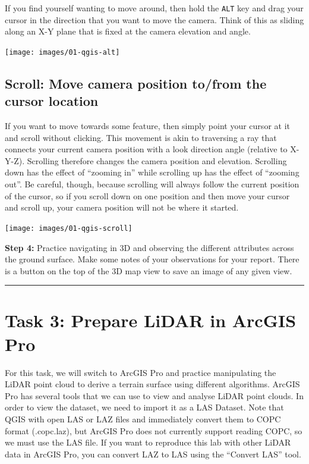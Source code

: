 \documentclass[
]{book}
\begin{document}
If you find yourself wanting to move around, then hold the \texttt{ALT} key and drag your cursor in the direction that you want to move the camera. Think of this as sliding along an X-Y plane that is fixed at the camera elevation and angle.

\texttt{[image: images/01-qgis-alt]}

\hypertarget{scroll-move-camera-position-tofrom-the-cursor-location}{%
\subsection*{Scroll: Move camera position to/from the cursor location}\label{scroll-move-camera-position-tofrom-the-cursor-location}}

If you want to move towards some feature, then simply point your cursor at it and scroll without clicking. This movement is akin to traversing a ray that connects your current camera position with a look direction angle (relative to X-Y-Z). Scrolling therefore changes the camera position and elevation. Scrolling down has the effect of ``zooming in'' while scrolling up has the effect of ``zooming out''. Be careful, though, because scrolling will always follow the current position of the cursor, so if you scroll down on one position and then move your cursor and scroll up, your camera position will not be where it started.

\texttt{[image: images/01-qgis-scroll]}

\textbf{Step 4:} Practice navigating in 3D and observing the different attributes across the ground surface. Make some notes of your observations for your report. There is a button on the top of the 3D map view to save an image of any given view.

\begin{center}\rule{0.5\linewidth}{0.5pt}\end{center}

\hypertarget{task-3-prepare-lidar-in-arcgis-pro}{%
\section*{Task 3: Prepare LiDAR in ArcGIS Pro}\label{task-3-prepare-lidar-in-arcgis-pro}}

For this task, we will switch to ArcGIS Pro and practice manipulating the LiDAR point cloud to derive a terrain surface using different algorithms. ArcGIS Pro has several tools that we can use to view and analyse LiDAR point clouds. In order to view the dataset, we need to import it as a LAS Dataset. Note that QGIS with open LAS or LAZ files and immediately convert them to COPC format (.copc.laz), but ArcGIS Pro does not currently support reading COPC, so we must use the LAS file. If you want to reproduce this lab with other LiDAR data in ArcGIS Pro, you can convert LAZ to LAS using the ``Convert LAS'' tool.
\end{document}
